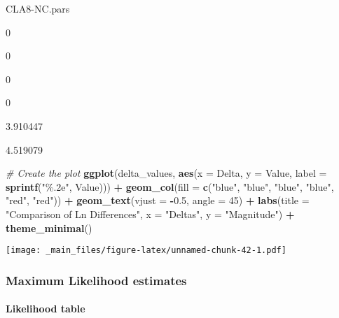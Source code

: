 \documentclass[
]{article}
\newenvironment{Shaded}{\begin{snugshade}}{\end{snugshade}}
\newcommand{\AttributeTok}[1]{\textcolor[rgb]{0.13,0.29,0.53}{#1}}
\newcommand{\CommentTok}[1]{\textcolor[rgb]{0.56,0.35,0.01}{\textit{#1}}}
\newcommand{\DecValTok}[1]{\textcolor[rgb]{0.00,0.00,0.81}{#1}}
\newcommand{\FloatTok}[1]{\textcolor[rgb]{0.00,0.00,0.81}{#1}}
\newcommand{\FunctionTok}[1]{\textcolor[rgb]{0.13,0.29,0.53}{\textbf{#1}}}
\newcommand{\NormalTok}[1]{#1}
\newcommand{\SpecialCharTok}[1]{\textcolor[rgb]{0.81,0.36,0.00}{\textbf{#1}}}
\newcommand{\StringTok}[1]{\textcolor[rgb]{0.31,0.60,0.02}{#1}}
\begin{document}
CLA8-NC.pars

0

0

0

0

3.910447

4.519079

\begin{Shaded}
\begin{Highlighting}[]
\CommentTok{\# Create the plot}
\FunctionTok{ggplot}\NormalTok{(delta\_values, }\FunctionTok{aes}\NormalTok{(}\AttributeTok{x =}\NormalTok{ Delta, }\AttributeTok{y =}\NormalTok{ Value, }\AttributeTok{label =} \FunctionTok{sprintf}\NormalTok{(}\StringTok{"\%.2e"}\NormalTok{, Value))) }\SpecialCharTok{+}
  \FunctionTok{geom\_col}\NormalTok{(}\AttributeTok{fill =} \FunctionTok{c}\NormalTok{(}\StringTok{"blue"}\NormalTok{, }\StringTok{"blue"}\NormalTok{, }\StringTok{"blue"}\NormalTok{, }\StringTok{"blue"}\NormalTok{, }\StringTok{"red"}\NormalTok{,  }\StringTok{"red"}\NormalTok{)) }\SpecialCharTok{+}
  \FunctionTok{geom\_text}\NormalTok{(}\AttributeTok{vjust =} \SpecialCharTok{{-}}\FloatTok{0.5}\NormalTok{, }\AttributeTok{angle =} \DecValTok{45}\NormalTok{) }\SpecialCharTok{+}
  \FunctionTok{labs}\NormalTok{(}\AttributeTok{title =} \StringTok{"Comparison of Ln Differences"}\NormalTok{, }\AttributeTok{x =} \StringTok{"Deltas"}\NormalTok{, }\AttributeTok{y =} \StringTok{"Magnitude"}\NormalTok{) }\SpecialCharTok{+}
  \FunctionTok{theme\_minimal}\NormalTok{()}
\end{Highlighting}
\end{Shaded}

\texttt{[image: \_main\_files/figure-latex/unnamed-chunk-42-1.pdf]}

\hypertarget{maximum-likelihood-estimates}{%
\subsubsection{Maximum Likelihood estimates}\label{maximum-likelihood-estimates}}

\hypertarget{likelihood-table-1}{%
\paragraph{Likelihood table}\label{likelihood-table-1}}
\end{document}
